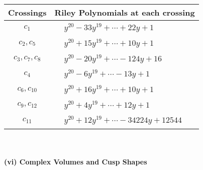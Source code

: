 \documentclass[1p]{elsarticle_modified}
\theoremstyle{definition}
\begin{document}
\begin{tabular}{m{50pt}|m{274pt}}
Crossings & \hspace{64pt}Riley Polynomials at each crossing \\
\hline $$\begin{aligned}c_{1}\end{aligned}$$&$\begin{aligned}
&y^{20}-33 y^{19}+\cdots+22 y+1
\end{aligned}$\\
\hline $$\begin{aligned}c_{2},c_{5}\end{aligned}$$&$\begin{aligned}
&y^{20}+15 y^{19}+\cdots+10 y+1
\end{aligned}$\\
\hline $$\begin{aligned}c_{3},c_{7},c_{8}\end{aligned}$$&$\begin{aligned}
&y^{20}-20 y^{19}+\cdots-124 y+16
\end{aligned}$\\
\hline $$\begin{aligned}c_{4}\end{aligned}$$&$\begin{aligned}
&y^{20}-6 y^{19}+\cdots-13 y+1
\end{aligned}$\\
\hline $$\begin{aligned}c_{6},c_{10}\end{aligned}$$&$\begin{aligned}
&y^{20}+16 y^{19}+\cdots+10 y+1
\end{aligned}$\\
\hline $$\begin{aligned}c_{9},c_{12}\end{aligned}$$&$\begin{aligned}
&y^{20}+4 y^{19}+\cdots+12 y+1
\end{aligned}$\\
\hline $$\begin{aligned}c_{11}\end{aligned}$$&$\begin{aligned}
&y^{20}+12 y^{19}+\cdots-34224 y+12544
\end{aligned}$\\
\hline
\end{tabular}\\~\\
\newpage\flushleft \textbf{(vi) Complex Volumes and Cusp Shapes}
\end{document}
